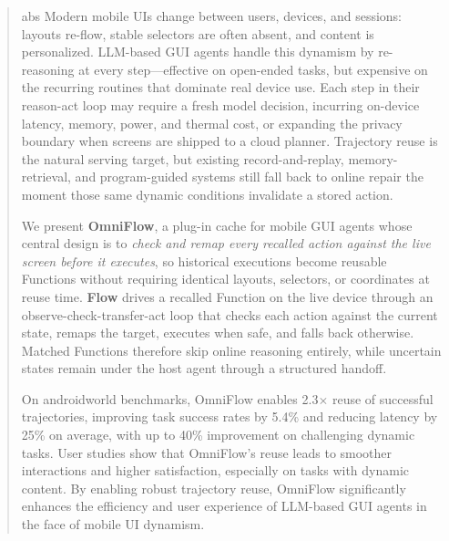 \begin{abstract}
    abs
Modern mobile UIs change between users, devices, and sessions: layouts
re-flow, stable selectors are often absent, and content is personalized.
LLM-based GUI agents handle this dynamism by re-reasoning at every
step---effective on open-ended tasks, but expensive on the recurring
routines that dominate real device use.  Each step in their reason-act
loop may require a fresh model decision, incurring on-device latency,
memory, power, and thermal cost, or expanding the privacy boundary when
screens are shipped to a cloud planner.  Trajectory reuse is the natural
serving target, but existing record-and-replay, memory-retrieval, and
program-guided systems still fall back to online repair the moment
those same dynamic conditions invalidate a stored action.

We present \textbf{OmniFlow}, a plug-in cache for mobile GUI agents
whose central design is to \emph{check and remap every recalled action
against the live screen before it executes}, so historical executions
become reusable Functions without requiring identical layouts, selectors,
or coordinates at reuse time.  
\textbf{Flow} drives a recalled Function on the live device through an
observe-check-transfer-act loop that checks each action against the current
state, remaps the target, executes when safe, and falls back otherwise.  Matched Functions therefore skip
online reasoning entirely, while uncertain states remain under the host
agent through a structured handoff.

On androidworld benchmarks, OmniFlow enables 2.3$\times$ reuse of successful trajectories, improving task success rates by 5.4\% and reducing latency by 25\% on average, with up to 40\% improvement on challenging dynamic tasks.  User studies show that OmniFlow's reuse leads to smoother interactions and higher satisfaction, especially on tasks with dynamic content.  By enabling robust trajectory reuse, OmniFlow significantly enhances the efficiency and user experience of LLM-based GUI agents in the face of mobile UI dynamism.

\end{abstract}
